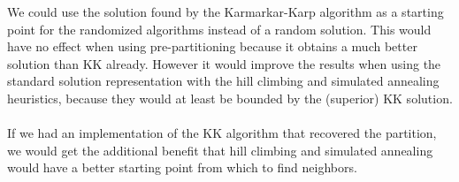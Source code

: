 \documentclass[11pt]{article}
\begin{document}
\newpage
We could use the solution found by the Karmarkar-Karp algorithm as a starting point for the randomized algorithms instead of a random solution. This would have no effect when using pre-partitioning because it obtains a much better solution than KK already. However it would improve the results when using the standard solution representation with the hill climbing and simulated annealing heuristics, because they would at least be bounded by the (superior) KK solution. \\
\\
If we had an implementation of the KK algorithm that recovered the partition, we would get the additional benefit that hill climbing and simulated annealing would have a better starting point from which to find neighbors.
\end{document}
